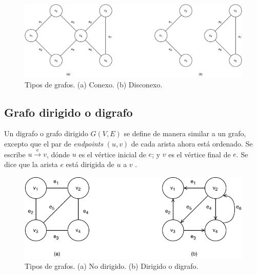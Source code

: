 \begin{figure}[H]
	\centering
	\includegraphics[width=1\linewidth]{document/GraphTheory/images/connected-disconnected-graph}
	\caption{Tipos de grafos. (a) Conexo. (b) Disconexo.}
	\label{fig:connected-disconnected-graph}
\end{figure}

\subsection{Grafo dirigido o digrafo}
Un digrafo o grafo dirigido \( G(V,E) \) se define de manera similar a un grafo, excepto que el par de \textit{\gls{endpoints}} \( (u, v) \) de cada arista ahora está ordenado. Se escribe \( u \xrightarrow{\text{e}} v \), dónde \( u \) es el vértice inicial de \( e \); y \( v \) es el vértice final de \( e \). Se dice que la arista \( e \) está dirigida de \( u \) a \( v \) \cite{even2011graph}.

\begin{figure}[H]
	\centering
	\includegraphics[width=0.6\linewidth]{document/GraphTheory/images/directed-undirected-graph}
	\caption{Tipos de grafos. (a) No dirigido. (b) Dirigido o digrafo. }
	\label{fig:directed-undirected-graph}
\end{figure}